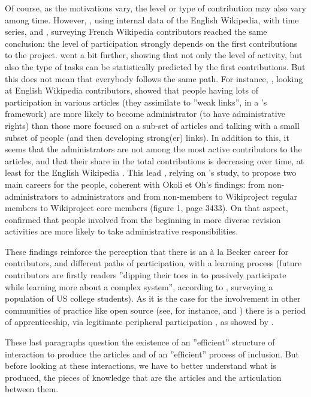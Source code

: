 Of course, as the motivations vary, the level or type of contribution
may also vary among time. However, \citet{PancieraHalfakerTerveen09},
using internal data of the English Wikipedia, with time series, and
\citet{DejeanJullien15}, surveying French Wikipedia contributors
reached the same conclusion: the level of participation strongly depends
on the first contributions to the project. \citet{AntinCheshireNov12}
went a bit further, showing that not only the level of activity, but
also the type of tasks can be statistically predicted by the first
contributions. But this does not mean that everybody follows the same
path. For instance, \citet{OkoliOh07}, looking at English Wikipedia
contributors, showed that people having lots of participation in various
articles (they assimilate to ''weak links'', in a \citet{Granovetter85}'s
framework) are more likely to become administrator (to have administrative
rights) than those more focused on a sub-set of articles and talking
with a small subset of people (and then developing strong(er) links).
In addition to this, it seems that the administrators are not among
the most active contributors to the articles, and that their share
in the total contributions is decreasing over time, at least for the
English Wikipedia \citep{Ortega07}. This lead \citet{Zhuetal11},
relying on \citet{Bryantetal05}'s study, to propose two main careers
for the people, coherent with Okoli et Oh's findings: from non-administrators
to administrators and from non-members to Wikiproject regular members
to Wikiproject core members (figure 1, page 3433). On that aspect,
\citet{AntinCheshireNov12} confirmed that people involved from the
beginning in more diverse revision activities are more likely to take
administrative responsibilities.

These findings reinforce the perception that there is an à la Becker
career for contributors, and different paths of participation, with
a learning process (future contributors are firstly readers ''dipping
their toes in to passively participate while learning more about a
complex system'', according to \citet{AntinCheshire10}, surveying
a population of US college students). As it is the case for the involvement
in other communities of practice like open source (see, for instance,
\citet{FangNeufeld09} and \citet{SchillingLaumerWeitzel12}) there
is a period of apprenticeship, via legitimate peripheral participation
\citep{LaveWenger91}, as showed by \citet{Bryantetal05}. 

These last paragraphs question the existence of an ''efficient''
structure of interaction to produce the articles and of an ''efficient''
process of inclusion. But before looking at these interactions, we
have to better understand what is produced, the pieces of knowledge
that are the articles and the articulation between them.